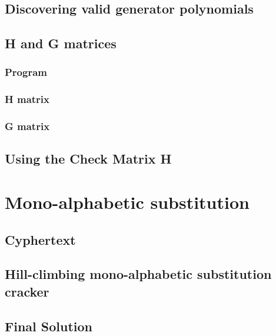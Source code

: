 \documentclass[pdftex, 12pt, a4paper]{article}
\begin{document}
\subsection{Discovering valid generator polynomials}\label{hammgen}

\pagebreak

\subsection{H and G matrices}
\subsubsection{Program}\label{hammgen-hg}

\subsubsection{H matrix}\label{h-matrix}
\subsubsection{G matrix}\label{g-matrix}
\pagebreak

\subsection{Using the Check Matrix H}\label{check-matrix}

\pagebreak

\section{Mono-alphabetic substitution}
\subsection{Cyphertext}\label{q3-cyphertext}

\subsection{Hill-climbing mono-alphabetic substitution cracker}\label{break-simplesub}

\pagebreak

\subsection{Final Solution}\label{q3-solution}
\pagebreak
\end{document}
